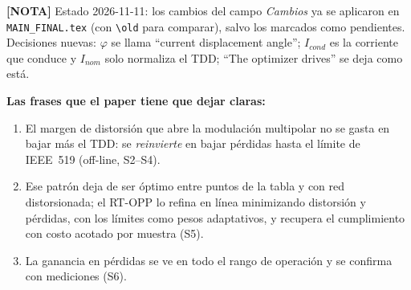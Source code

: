 \documentclass[11pt,a4paper]{article}
\newcommand{\nota}[1]{{\color{Note}\textbf{[NOTA]} #1}}
\begin{document}
\vspace{3mm}
\begin{center}
\end{center}

\nota{Estado 2026-11-11: los cambios del campo \emph{Cambios} ya se
aplicaron en \texttt{MAIN\_FINAL.tex} (con \texttt{\textbackslash old} para
comparar), salvo los marcados como pendientes. Decisiones nuevas: $\varphi$ se
llama ``current displacement angle''; $I_{cond}$ es la corriente que conduce y
$I_{nom}$ solo normaliza el TDD; ``The optimizer drives'' se deja como está.}

\noindent\textbf{Las frases que el paper tiene que dejar claras:}
\begin{enumerate}[leftmargin=6mm]
\item El margen de distorsión que abre la modulación multipolar no se gasta
      en bajar más el TDD: se \emph{reinvierte} en bajar pérdidas hasta el
      límite de IEEE~519 (off-line, S2--S4).
\item Ese patrón deja de ser óptimo entre puntos de la tabla y con red
      distorsionada; el RT-OPP lo refina en línea minimizando distorsión y
      pérdidas, con los límites como pesos adaptativos, y recupera el
      cumplimiento con costo acotado por muestra (S5).
\item La ganancia en pérdidas se ve en todo el rango de operación y se
      confirma con mediciones (S6).
\end{enumerate}
\end{document}
